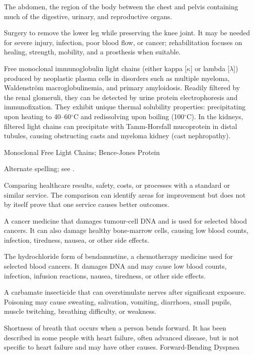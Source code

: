  The abdomen, the region of the body between the chest and pelvis containing much of the digestive, urinary, and reproductive organs.

 Surgery to remove the lower leg while preserving the knee joint. It may be needed for severe injury, infection, poor blood flow, or cancer; rehabilitation focuses on healing, strength, mobility, and a prosthesis when suitable.

 Free monoclonal immunoglobulin light chains (either kappa [$\kappa$] or lambda [$\lambda$]) produced by neoplastic plasma cells in disorders such as multiple myeloma, Waldenström macroglobulinemia, and primary amyloidosis. Readily filtered by the renal glomeruli, they can be detected by urine protein electrophoresis and immunofixation. They exhibit unique thermal solubility properties: precipitating upon heating to 40--60$^\circ$C and redissolving upon boiling (100$^\circ$C). In the kidneys, filtered light chains can precipitate with Tamm-Horsfall mucoprotein in distal tubules, causing obstructing casts and myeloma kidney (cast nephropathy).

\synonyms
Monoclonal Free Light Chains; Bence-Jones Protein

 Alternate spelling; see .

 Comparing healthcare results, safety, costs, or processes with a standard or similar service. The comparison can identify areas for improvement but does not by itself prove that one service causes better outcomes.

 A cancer medicine that damages tumour-cell DNA and is used for selected blood cancers. It can also damage healthy bone-marrow cells, causing low blood counts, infection, tiredness, nausea, or other side effects.

 The hydrochloride form of bendamustine, a chemotherapy medicine used for selected blood cancers. It damages DNA and may cause low blood counts, infection, infusion reactions, nausea, tiredness, or other side effects.

 A carbamate insecticide that can overstimulate nerves after significant exposure. Poisoning may cause sweating, salivation, vomiting, diarrhoea, small pupils, muscle twitching, breathing difficulty, or weakness.

 Shortness of breath that occurs when a person bends forward. It has been described in some people with heart failure, often advanced disease, but is not specific to heart failure and may have other causes.
\synonyms
Forward-Bending Dyspnea

